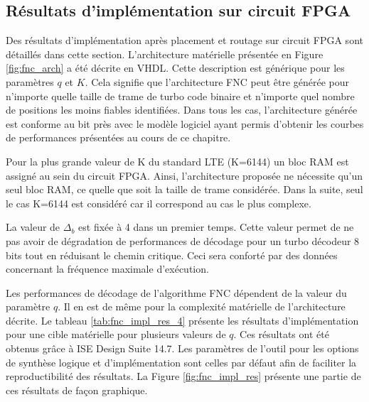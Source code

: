 \subsection{Résultats d'implémentation sur circuit FPGA}
Des résultats d'implémentation après placement et routage sur circuit FPGA sont détaillés dans cette section. L'architecture 
matérielle  présentée en Figure \ref{fig:fnc_arch} a été décrite en VHDL. 
Cette description est générique pour les paramètres $q$ et $K$. Cela signifie que l'architecture FNC peut être générée pour n'importe 
quelle taille de trame de turbo code binaire et n'importe quel nombre de positions les moins fiables identifiées. Dans
tous les cas, 
l'architecture générée est conforme au bit près avec le modèle logiciel ayant permis d'obtenir les courbes de 
performances présentées au cours de ce chapitre.

Pour la plus grande valeur de K du standard LTE (K=6144) un bloc RAM est assigné au sein du circuit FPGA. Ainsi, 
l'architecture proposée ne nécessite qu'un seul bloc RAM, ce quelle que soit la taille de trame considérée. Dans la 
suite, seul le cas K=6144 est considéré car il correspond au cas le plus complexe.

La valeur de $\Delta_b$ est fixée à 4 dans un premier temps. Cette valeur permet de ne pas avoir de dégradation de 
performances de décodage pour un turbo décodeur 8 bits tout en réduisant le 
chemin critique. Ceci sera conforté par des données concernant la fréquence maximale d'exécution.

Les performances de décodage de l'algorithme FNC dépendent de la valeur du paramètre $q$. Il en est de même pour la
complexité matérielle de l'architecture décrite. Le tableau \ref{tab:fnc_impl_res_4} présente les résultats 
d'implémentation pour une cible matérielle   pour plusieurs valeurs de $q$. Ces
résultats ont été obtenus grâce à ISE Design Suite 14.7. Les paramètres de l'outil pour les options de synthèse logique
et d'implémentation sont celles par défaut afin de faciliter la reproductibilité des résultats. La Figure \ref{fig:fnc_impl_res} présente une partie de ces résultats de façon graphique.

